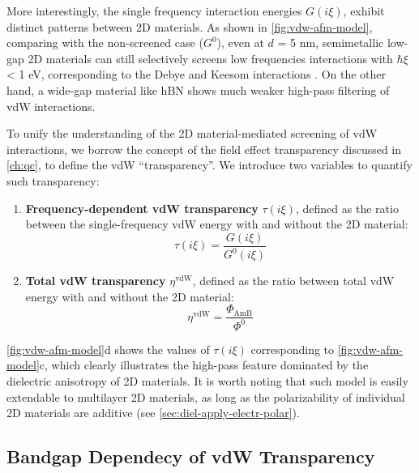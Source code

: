 More interestingly, the single frequency interaction energies
\(G(i\xi)\), exhibit distinct patterns between 2D materials. As shown
in \autoref{fig:vdw-afm-model}, comparing with the non-screened case
($G^{0}$), even at \(d\) = 5 nm, semi\-metallic low-gap 2D materials
can still selectively screens low frequencies interactions with
\(\hbar\xi\) \textless{} 1 eV, corresponding to the Debye and Keesom
interactions \cite{Israelachvili_2011_book}.
%
On the other hand, a wide-gap material like hBN shows much weaker high-pass filtering of vdW interactions.
%

To unify the understanding of the 2D material-mediated screening of
vdW interactions, we borrow the concept of the field effect
transparency discussed in \autoref{ch:qc}, to define the vdW
``transparency''. We introduce two variables to quantify such transparency:
\begin{enumerate}
\item {\bfseries Frequency-dependent vdW transparency} $\tau(i\xi)$,
  defined as the ratio between the single-frequency vdW energy with
  and without the 2D material:
  \begin{equation*}
  \label{eq:vdw-def-tau}
  \tau(i \xi) = \frac{G(i \xi)}{G^{0}(i\xi)}
\end{equation*}

\item {\bfseries Total vdW transparency}  $\eta^{\mathrm{vdW}}$, defined as
  the ratio between total vdW energy with and without the 2D material:
  \begin{equation*}
\label{eq:vdw-def-total-trans}
\eta^{\mathrm{vdW}} = \frac{\Phi_{\mathrm{AmB}}}{\Phi^{0}}
\end{equation*}
\end{enumerate}
%
\autoref{fig:vdw-afm-model}d shows the values of $\tau(i \xi)$
corresponding to \autoref{fig:vdw-afm-model}c, which clearly
illustrates the high-pass feature dominated by the dielectric
anisotropy of 2D materials. It is worth noting that such model is
easily extendable to multilayer 2D materials, as long as the
polarizability of individual 2D materials are additive (see
\autoref{sec:diel-apply-electr-polar}).

\subsection{Bandgap Dependecy of vdW Transparency}
\label{sec:bandg-depend-vdw}

